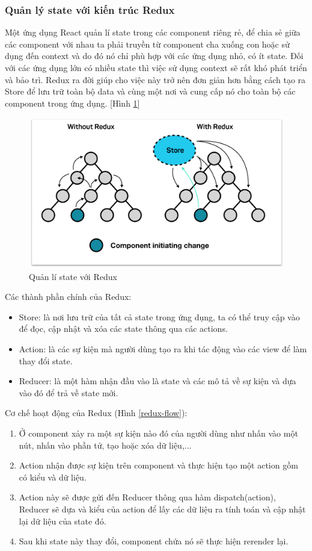 \subsubsection{Quản lý state với kiến trúc Redux}

Một ứng dụng React quản lí state trong các component riêng rẻ, để chia sẻ giữa các component với nhau ta phải truyền từ component cha xuống con hoặc sử dụng đến context và do đó nó chỉ phù hợp với các ứng dụng nhỏ, có ít state. Đối với các ứng dụng lớn có nhiều state thì việc sử dụng context sẽ rất khó phát triển và bảo trì. Redux \cite{redux_state} ra đời giúp cho việc này trở nên đơn giản hơn bằng cách tạo ra Store để lưu trữ toàn bộ data và cùng một nơi và cung cấp nó cho toàn bộ các component trong ứng dụng. [Hình \ref{redux}]\par
\begin{figure}[H]
    \begin{center}
        \includegraphics[width=12cm]{Image/Technical/redux.png}
        \caption{Quản lí state với Redux}
        \label{redux}
    \end{center}
\end{figure}
Các thành phần chính của Redux:
\begin{itemize}
    \item Store: là nơi lưu trữ của tất cả state trong ứng dụng, ta có thể truy cập vào để đọc, cập nhật và xóa các state thông qua các actions.
    \item Action: là các sự kiện mà người dùng tạo ra khi tác động vào các view để làm thay đổi state.
    \item Reducer: là một hàm nhận đầu vào là state và các mô tả về sự kiện và dựa vào đó để trả về state mới.
\end{itemize}

Cơ chế hoạt động của Redux (Hình \ref{redux-flow}):
\begin{enumerate}
    \item Ở component xảy ra một sự kiện nào đó của người dùng như nhấn vào một nút, nhấn vào phần tử, tạo hoặc xóa dữ liệu,...
    \item Action nhận được sự kiện trên component và thực hiện tạo một action gồm có kiểu và dữ liệu.
    \item Action này sẽ được gửi đến Reducer thông qua hàm dispatch(action), Reducer sẽ dựa và kiểu của action để lấy các dữ liệu ra tính toán và cập nhật lại dữ liệu của state đó.
    \item Sau khi state này thay đổi, component chứa nó sẽ thực hiện rerender lại.
\end{enumerate}


